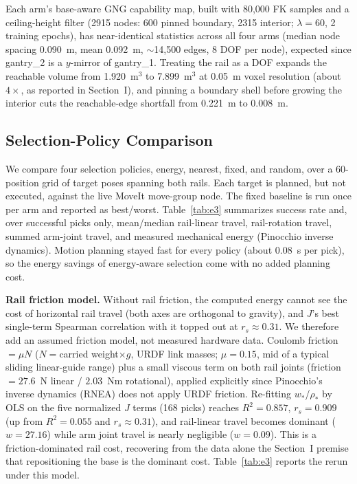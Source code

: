 \documentclass[conference]{IEEEtran}
\begin{document}
Each arm's base-aware GNG capability map, built with 80{,}000 FK
samples and a ceiling-height filter (2915 nodes: 600 pinned boundary, 2315
interior; $\lambda=60$, 2 training epochs), has near-identical statistics across
all four arms (median node spacing 0.090~m, mean 0.092~m, $\sim$14{,}500 edges, 8
DOF per node), expected since gantry\_2 is a $y$-mirror of gantry\_1. Treating
the rail as a DOF expands the reachable volume from 1.920~m$^3$ to 7.899~m$^3$ at
0.05~m voxel resolution (about $4\times$, as reported in Section~I), and pinning a
boundary shell before growing the interior cuts the reachable-edge shortfall from
0.221~m to 0.008~m.

\subsection{Selection-Policy Comparison}

We compare four selection policies, energy, nearest, fixed, and
random, over a 60-position grid of target poses spanning both rails. Each
target is planned, but not executed, against the live MoveIt move-group node. The fixed baseline is run once per
arm and reported as best/worst. Table~\ref{tab:e3} summarizes success rate and, over
successful picks only, mean/median rail-linear travel, rail-rotation travel,
summed arm-joint travel, and measured mechanical energy (Pinocchio inverse dynamics).
Motion planning stayed fast for every policy (about 0.08~s per pick), so the
energy savings of energy-aware selection come with no added planning cost.

\textbf{Rail friction model.} Without rail friction, the computed energy cannot
see the cost of horizontal rail travel (both axes are orthogonal to gravity), and
$J$'s best single-term Spearman correlation with it topped out at $r_s\approx0.31$.
We therefore add an assumed friction model, not measured hardware data. Coulomb friction $=\mu N$ ($N=$carried
weight$\times g$, URDF link masses; $\mu=0.15$, mid of a typical sliding linear-guide
range) plus a small viscous term on both rail joints (friction $=27.6$~N linear /
$2.03$~Nm rotational), applied explicitly since Pinocchio's inverse dynamics (RNEA) does not
apply URDF friction. Re-fitting $w_*$/$\rho_*$
by OLS on the five normalized $J$ terms (168 picks) reaches $R^2=0.857$,
$r_s=0.909$ (up from $R^2=0.055$ and $r_s\approx0.31$), and
rail-linear travel becomes dominant ($w=27.16$) while arm joint travel is nearly
negligible ($w=0.09$). This is a friction-dominated rail cost, recovering from the data
alone the Section~I premise that repositioning the base is the dominant cost.
Table~\ref{tab:e3} reports the rerun under this model.
\end{document}
